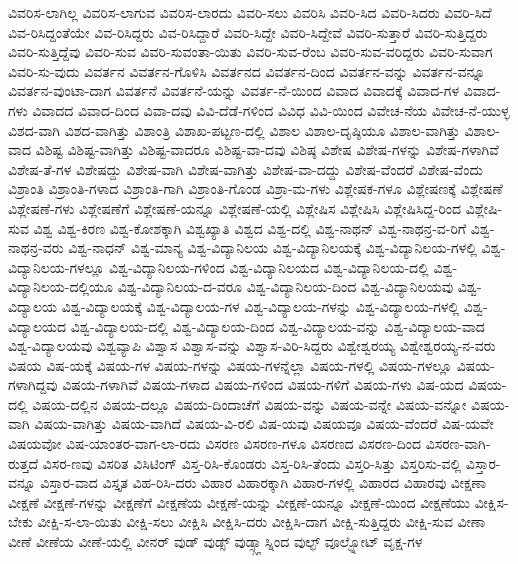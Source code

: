 {ವಿವರಿಸ-ಲಾಗಿಲ್ಲ
ವಿವರಿಸ-ಲಾಗುವ
ವಿವರಿಸ-ಲಾರದು
ವಿವರಿ-ಸಲು
ವಿವರಿಸಿ
ವಿವರಿ-ಸಿದ
ವಿವರಿ-ಸಿದರು
ವಿವರಿ-ಸಿದೆ
ವಿವ-ರಿಸಿದ್ದಂತೆಯೇ
ವಿವ-ರಿಸಿದ್ದರು
ವಿವ-ರಿಸಿದ್ದಾರೆ
ವಿವರಿ-ಸಿದ್ದೇ
ವಿವರಿ-ಸಿದ್ದೇವೆ
ವಿವರಿ-ಸುತ್ತಾರೆ
ವಿವರಿ-ಸುತ್ತಿದ್ದರು
ವಿವರಿ-ಸುತ್ತಿದ್ದೆವು
ವಿವರಿ-ಸುವ
ವಿವರಿ-ಸುವಂತಾ-ಯಿತು
ವಿವರಿ-ಸುವ-ರೆಂಬ
ವಿವರಿ-ಸುವ-ವರಿದ್ದರು
ವಿವರಿ-ಸುವಾಗ
ವಿವರಿ-ಸು-ವುದು
ವಿವರ್ತನ
ವಿವರ್ತನ-ಗೊಳಿಸಿ
ವಿವರ್ತನದ
ವಿವರ್ತನ-ದಿಂದ
ವಿವರ್ತನ-ವನ್ನು
ವಿವರ್ತನ-ವನ್ನೂ
ವಿವರ್ತನ-ವುಂಟಾ-ದಾಗ
ವಿವರ್ತನೆ
ವಿವರ್ತನೆ-ಯನ್ನು
ವಿವರ್ತ-ನೆ-ಯಿಂದ
ವಿವಾದ
ವಿವಾದಕ್ಕೆ
ವಿವಾದ-ಗಳ
ವಿವಾದ-ಗಳು
ವಿವಾದದ
ವಿವಾದ-ದಿಂದ
ವಿವಾ-ದವು
ವಿವಿ-ದೆಡೆ-ಗಳಿಂದ
ವಿವಿಧ
ವಿವಿ-ಯಿಂದ
ವಿವೇಚ-ನೆಯ
ವಿವೇಚ-ನೆ-ಯುಳ್ಳ
ವಿಶದ-ವಾಗಿ
ವಿಶದ-ವಾಗಿತ್ತು
ವಿಶಾಂತ್ರಿ
ವಿಶಾಖ-ಪಟ್ಟಣ-ದಲ್ಲಿ
ವಿಶಾಲ
ವಿಶಾಲ-ದೃಷ್ಠಿಯೂ
ವಿಶಾಲ-ವಾಗಿತ್ತು
ವಿಶಾಲ-ವಾದ
ವಿಶಿಷ್ಟ
ವಿಶಿಷ್ಟ-ವಾಗಿತ್ತು
ವಿಶಿಷ್ಟ-ವಾದರೂ
ವಿಶಿಷ್ಟ-ವಾ-ದವು
ವಿಶಿಷ್ಠ
ವಿಶೇಷ
ವಿಶೇಷ-ಗಳನ್ನು
ವಿಶೇಷ-ಗಳಾಗಿವೆ
ವಿಶೇಷ-ತೆ-ಗಳ
ವಿಶೇಷದ್ದು
ವಿಶೇಷ-ವಾಗಿ
ವಿಶೇಷ-ವಾಗಿತ್ತು
ವಿಶೇಷ-ವಾ-ದದ್ದು
ವಿಶೇಷ-ವೆಂದರೆ
ವಿಶೇಷ-ವೆಂದು
ವಿಶ್ರಾಂತಿ
ವಿಶ್ರಾಂತಿ-ಗಳಾದ
ವಿಶ್ರಾಂತಿ-ಗಾಗಿ
ವಿಶ್ರಾಂತಿ-ಗೊಂಡ
ವಿಶ್ರಾ-ಮ-ಗಳು
ವಿಶ್ಲೇಷಕ-ಗಳೂ
ವಿಶ್ಲೇಷಣಕ್ಕೆ
ವಿಶ್ಲೇಷಣೆ
ವಿಶ್ಲೇಷಣೆ-ಗಳು
ವಿಶ್ಲೇಷಣೆಗೆ
ವಿಶ್ಲೇಷಣೆ-ಯನ್ನೂ
ವಿಶ್ಲೇಷಣೆ-ಯಲ್ಲಿ
ವಿಶ್ಲೇಷಿಸ
ವಿಶ್ಲೇಷಿಸಿ
ವಿಶ್ಲೇಷಿಸಿದ್ದ-ರಿಂದ
ವಿಶ್ಲೇಷಿ-ಸುವ
ವಿಶ್ವ
ವಿಶ್ವ-ಕಿರಣ
ವಿಶ್ವ-ಕೋಶಕ್ಕಾಗಿ
ವಿಶ್ವಖ್ಯಾತಿ
ವಿಶ್ವದ
ವಿಶ್ವ-ದಲ್ಲಿ
ವಿಶ್ವ-ನಾಥನ್
ವಿಶ್ವ-ನಾಥನ್ರ-ವ-ರಿಗೆ
ವಿಶ್ವ-ನಾಥನ್ರ-ವರು
ವಿಶ್ವ-ನಾಧನ್
ವಿಶ್ವ-ಮಾನ್ಯ
ವಿಶ್ವ-ವಿದ್ಯಾನಿಲಯ
ವಿಶ್ವ-ವಿದ್ಯಾನಿಲಯಕ್ಕೆ
ವಿಶ್ವ-ವಿದ್ಯಾನಿಲಯ-ಗಳಲ್ಲಿ
ವಿಶ್ವ-ವಿದ್ಯಾನಿಲಯ-ಗಳಲ್ಲೂ
ವಿಶ್ವ-ವಿದ್ಯಾನಿಲಯ-ಗಳಿಂದ
ವಿಶ್ವ-ವಿದ್ಯಾನಿಲಯದ
ವಿಶ್ವ-ವಿದ್ಯಾನಿಲಯ-ದಲ್ಲಿ
ವಿಶ್ವ-ವಿದ್ಯಾನಿಲಯ-ದಲ್ಲಿಯೂ
ವಿಶ್ವ-ವಿದ್ಯಾನಿಲಯ-ದ-ವರೂ
ವಿಶ್ವ-ವಿದ್ಯಾನಿಲಯ-ದಿಂದ
ವಿಶ್ವ-ವಿದ್ಯಾನಿಲಯವು
ವಿಶ್ವ-ವಿದ್ಯಾಲಯ
ವಿಶ್ವ-ವಿದ್ಯಾಲಯಕ್ಕೆ
ವಿಶ್ವ-ವಿದ್ಯಾಲಯ-ಗಳ
ವಿಶ್ವ-ವಿದ್ಯಾಲಯ-ಗಳನ್ನು
ವಿಶ್ವ-ವಿದ್ಯಾಲಯ-ಗಳಲ್ಲಿ
ವಿಶ್ವ-ವಿದ್ಯಾಲಯದ
ವಿಶ್ವ-ವಿದ್ಯಾಲಯ-ದಲ್ಲಿ
ವಿಶ್ವ-ವಿದ್ಯಾಲಯ-ದಿಂದ
ವಿಶ್ವ-ವಿದ್ಯಾಲಯ-ವನ್ನು
ವಿಶ್ವ-ವಿದ್ಯಾಲಯ-ವಾದ
ವಿಶ್ವ-ವಿದ್ಯಾಲಯವು
ವಿಶ್ವವ್ಯಾಪಿ
ವಿಶ್ವಾಸ
ವಿಶ್ವಾಸ-ವನ್ನು
ವಿಶ್ವಾಸ-ವಿರಿ-ಸಿದ್ದರು
ವಿಶ್ವೇಶ್ವರಯ್ಯ
ವಿಶ್ವೇಶ್ವರಯ್ಯ-ನ-ವರು
ವಿಷಯ
ವಿಷ-ಯಕ್ಕೆ
ವಿಷಯ-ಗಳ
ವಿಷಯ-ಗಳನ್ನು
ವಿಷಯ-ಗಳನ್ನೆಲ್ಲಾ
ವಿಷಯ-ಗಳಲ್ಲಿ
ವಿಷಯ-ಗಳಲ್ಲೂ
ವಿಷಯ-ಗಳಾಗಿದ್ದವು
ವಿಷಯ-ಗಳಾಗಿವೆ
ವಿಷಯ-ಗಳಾದ
ವಿಷಯ-ಗಳಿಂದ
ವಿಷಯ-ಗಳಿಗೆ
ವಿಷಯ-ಗಳು
ವಿಷ-ಯದ
ವಿಷಯ-ದಲ್ಲಿ
ವಿಷಯ-ದಲ್ಲಿನ
ವಿಷಯ-ದಲ್ಲೂ
ವಿಷಯ-ದಿಂದಾಚೆಗೆ
ವಿಷಯ-ವನ್ನು
ವಿಷಯ-ವನ್ನೇ
ವಿಷಯ-ವನ್ನೋ
ವಿಷಯ-ವಾಗಿ
ವಿಷಯ-ವಾಗಿತ್ತು
ವಿಷಯ-ವಾಗಿದೆ
ವಿಷಯ-ವಿ-ರಲಿ
ವಿಷ-ಯವು
ವಿಷಯವೂ
ವಿಷಯ-ವೆಂದರೆ
ವಿಷ-ಯವೇ
ವಿಷಯವೋ
ವಿಷ-ಯಾಂತರ-ವಾಗ-ಲಾ-ರದು
ವಿಸರಣ
ವಿಸರಣ-ಗಳೂ
ವಿಸರಣದ
ವಿಸರಣ-ದಿಂದ
ವಿಸರಣ-ವಾಗಿ-ರುತ್ತದೆ
ವಿಸರ-ಣವು
ವಿಸರಿತ
ವಿಸಿಟಿಂಗ್
ವಿಸ್ತ-ರಿಸಿ-ಕೊಂಡರು
ವಿಸ್ತ-ರಿಸಿ-ತೆಂದು
ವಿಸ್ತರಿ-ಸಿತ್ತು
ವಿಸ್ತರಿಸು-ವಲ್ಲಿ
ವಿಸ್ತಾರ-ವನ್ನೂ
ವಿಸ್ತಾರ-ವಾದ
ವಿಸ್ತೃತ
ವಿಹ-ರಿಸಿ-ದರು
ವಿಹಾರ
ವಿಹಾರಕ್ಕಾಗಿ
ವಿಹಾರ-ಗಳಲ್ಲಿ
ವಿಹಾರದ
ವಿಹಾರವು
ವೀಕ್ಷಣಾ
ವೀಕ್ಷಣೆ
ವೀಕ್ಷಣೆ-ಗಳನ್ನು
ವೀಕ್ಷಣೆಗೆ
ವೀಕ್ಷಣೆಯ
ವೀಕ್ಷಣೆ-ಯನ್ನು
ವೀಕ್ಷಣೆ-ಯನ್ನೂ
ವೀಕ್ಷಣೆ-ಯಿಂದ
ವೀಕ್ಷಣೆಯು
ವೀಕ್ಷಿಸ-ಬೇಕು
ವೀಕ್ಷಿ-ಸ-ಲಾ-ಯಿತು
ವೀಕ್ಷಿ-ಸಲು
ವೀಕ್ಷಿಸಿ
ವೀಕ್ಷಿಸಿ-ದರು
ವೀಕ್ಷಿಸಿ-ದಾಗ
ವೀಕ್ಷಿ-ಸುತ್ತಿದ್ದರು
ವೀಕ್ಷಿ-ಸುವ
ವೀಣಾ
ವೀಣೆ
ವೀಣೆಯ
ವೀಣೆ-ಯಲ್ಲಿ
ವೀನರ್
ವುಡ್
ವುಡ್ಸ್
ವುಡ್ಸ್ಗ್ಲಾಸ್ನಿಂದ
ವುಲ್ಫ್
ವೂಲ್ಫ್ನೋಟ್
ವೃಕ್ಷ-ಗಳ
}
